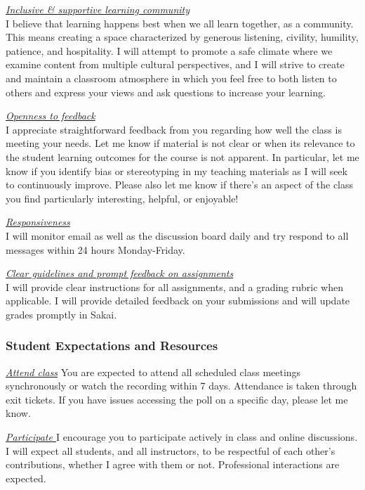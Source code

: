 \documentclass[
  letterpaper,
  DIV=11,
  numbers=noendperiod]{scrartcl}
\begin{document}
\ul{\emph{Inclusive \& supportive learning community}}\\
I believe that learning happens best when we all learn together, as a
community. This means creating a space characterized by generous
listening, civility, humility, patience, and hospitality. I will attempt
to promote a safe climate where we examine content from multiple
cultural perspectives, and I will strive to create and maintain a
classroom atmosphere in which you feel free to both listen to others and
express your views and ask questions to increase your learning.

\ul{\emph{Openness to feedback}}\\
I appreciate straightforward feedback from you regarding how well the
class is meeting your needs. Let me know if material is not clear or
when its relevance to the student learning outcomes for the course is
not apparent. In particular, let me know if you identify bias or
stereotyping in my teaching materials as I will seek to continuously
improve. Please also let me know if there's an aspect of the class you
find particularly interesting, helpful, or enjoyable!

\ul{\emph{Responsiveness\\
}}I will monitor email as well as the discussion board daily and try
respond to all messages within 24 hours Monday-Friday.

\ul{\emph{Clear guidelines and prompt feedback on assignments}}\\
I will provide clear instructions for all assignments, and a grading
rubric when applicable. I will provide detailed feedback on your
submissions and will update grades promptly in Sakai.

\hypertarget{student-expectations-and-resources}{%
\subsubsection{Student Expectations and
Resources}\label{student-expectations-and-resources}}

\ul{\emph{Attend class}}\textbf{\hfill\break
}You are expected to attend all scheduled class meetings synchronously
or watch the recording within 7 days. Attendance is taken through exit
tickets. If you have issues accessing the poll on a specific day, please
let me know.~

\ul{\emph{Participate\textbf{\hfill\break
}}}I encourage you to participate actively in class and online
discussions. I will expect all students, and all instructors, to be
respectful of each other's contributions, whether I agree with them or
not. Professional interactions are expected.
\end{document}
